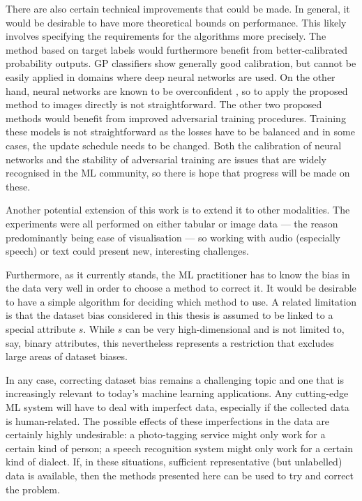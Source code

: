 There are also certain technical improvements that could be made.
In general, it would be desirable to have more theoretical bounds on performance.
This likely involves specifying the requirements for the algorithms more precisely.
The method based on target labels would furthermore benefit from better-calibrated probability outputs.
\acf{GP} classifiers show generally good calibration,
but cannot be easily applied in domains where deep neural networks are used.
On the other hand, neural networks are known to be overconfident
\citep[especially when using ReLU activations;][]{hein2019relu},
so to apply the proposed method to images directly is not straightforward.
The other two proposed methods would benefit from improved adversarial training procedures.
Training these models is not straightforward as the losses have to be balanced
and in some cases, the update schedule needs to be changed.
Both the calibration of neural networks and the stability of adversarial training
are issues that are widely recognised in the \ac{ML} community,
so there is hope that progress will be made on these.

Another potential extension of this work is to extend it to other modalities.
The experiments were all performed on either tabular or image data
--- the reason predominantly being ease of visualisation ---
so working with audio (especially speech) or text could present new, interesting challenges.

Furthermore, as it currently stands,
the \ac{ML} practitioner has to know the bias in the data very well in order to choose a method to correct it.
It would be desirable to have a simple algorithm for deciding which method to use.
A related limitation is that the dataset bias considered in this thesis
is assumed to be linked to a special attribute \(s\).
While \(s\) can be very high-dimensional and is not limited to, say, binary attributes,
this nevertheless represents a restriction
that excludes large areas of dataset biases.

In any case, correcting dataset bias remains a challenging topic
and one that is increasingly relevant to today's machine learning applications.
Any cutting-edge \ac{ML} system will have to deal with imperfect data,
especially if the collected data is human-related.
The possible effects of these imperfections in the data are certainly highly undesirable:
a photo-tagging service might only work for a certain kind of person;
a speech recognition system might only work for a certain kind of dialect.
If, in these situations, sufficient representative (but unlabelled) data is available,
then the methods presented here can be used to try and correct the problem.


